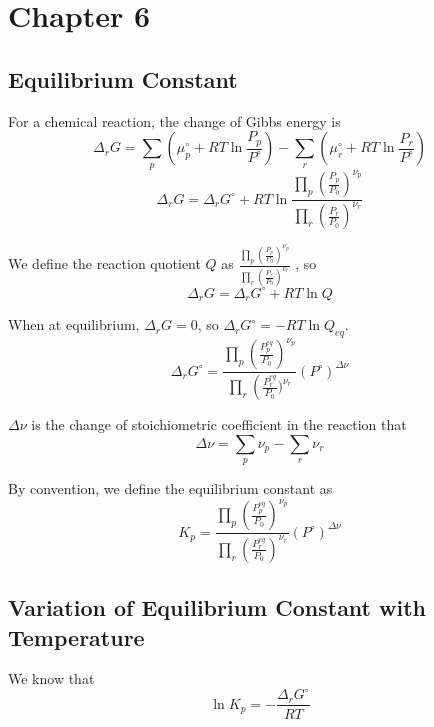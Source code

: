 \documentclass[letterpaper]{article}
\newcommand{\zero}{^\circ}
\begin{document}
\newpage
\section*{Chapter 6}
\subsection*{Equilibrium Constant}
For a chemical reaction, the change of Gibbs energy is
\begin{equation*}
    \Delta_rG=\sum_p(\mu_p\zero+RT\ln\frac{P_p}{P\zero})-\sum_r(\mu_r\zero+RT\ln\frac{P_r}{P\zero})
\end{equation*}
\begin{equation*}
    \Delta_rG=\Delta_rG\zero+RT\ln\frac{\prod_p\left(\frac{P_p}{P_0}\right)^{\nu_p}}{\prod_r\left(\frac{P_r}{P_0}\right)^{\nu_r}}
\end{equation*}

We define the reaction quotient $Q$ as $\frac{\prod_p\left(\frac{P_p}{P_0}\right)^{\nu_p}}{\prod_r\left(\frac{P_r}{P_0}\right)^{\nu_r}}$
, so
\begin{equation*}
    \Delta_rG=\Delta_rG\zero+RT\ln Q
\end{equation*}

When at equilibrium, $\Delta_rG=0$, so $\Delta_rG\zero=-RT\ln Q_{eq}$.
\begin{equation*}
    \Delta_rG\zero=\frac{\prod_p\left(\frac{P_p^{eq}}{P_0}\right)^{\nu_p}}
    {\prod_r\left(\frac{P_r^{eq}}{P_0}\right.)^{\nu_r}}(P^\circ)^{\Delta\nu}
\end{equation*}

$\Delta\nu$ is the change of stoichiometric coefficient in the reaction that
\begin{equation*}
    \Delta\nu = \sum_p\nu_p-\sum_r\nu_r
\end{equation*}

By convention, we define the equilibrium constant as
\begin{equation*}
    K_p=\frac{\prod_p\left(\frac{P_p^{eq}}{P_0}\right)^{\nu_p}}
    {\prod_r\left(\frac{P_r^{eq}}{P_0}\right)^{\nu_r}}(P^\circ)^{\Delta\nu}
\end{equation*}
\subsection*{Variation of Equilibrium Constant with Temperature}
We know that
\begin{equation*}
    \ln K_p=-\frac{\Delta_rG\zero}{RT}
\end{equation*}
\end{document}
